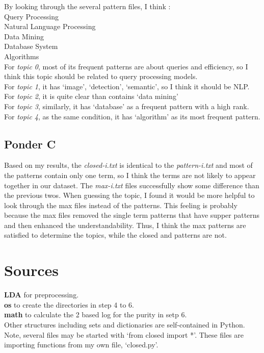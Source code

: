 \documentclass[11pt]{article}
\begin{document}
By looking through the several pattern files, I think :\\
	\hspace*{2em}{\it topic 0} Query Processing\\
	\hspace*{2em}{\it topic 1} Natural Language Processing \\
	\hspace*{2em}{\it topic 2} Data Mining\\
	\hspace*{2em}{\it topic 3} Database System\\
	\hspace*{2em}{\it topic 4} Algorithms\\
For {\it topic 0}, most of its frequent patterns are about queries and efficiency, so I think this topic should be related to query processing models.\\
For {\it topic 1}, it has `image', `detection', `semantic', so I think it should be NLP.\\
For {\it topic 2}, it is quite clear than contains `data mining'\\
For {\it topic 3}, similarly, it has `database' as a frequent pattern with a high rank.\\
For {\it topic 4}, as the same condition, it has `algorithm' as its most frequent pattern.

\subsection{Ponder C}

Based on my results, the {\it closed-i.txt} is identical to the {\it pattern-i.txt} and most of the patterns contain only one term, so I think the terms are not likely to appear together in our dataset. The {\it max-i.txt} files successfully show some difference than the previous twos. When guessing the topic, I found it would be more helpful to look through the max files instead of the patterns. This feeling is probably because the max files removed the single term patterns that have supper patterns and then enhanced the understandability. Thus, I think the max patterns are satisfied to determine the topics, while the closed and patterns are not.



\section{Sources}
{\bf LDA} for preprocessing.\\
{\bf os} to create the directories in step 4 to 6.\\
{\bf math} to calculate the 2 based log for the purity in setp 6.\\
Other structures including sets and dictionaries are self-contained in Python. \\
Note, several files may be started with `from closed import *'. These files are importing functions from my own file, `closed.py'.
\end{document}

